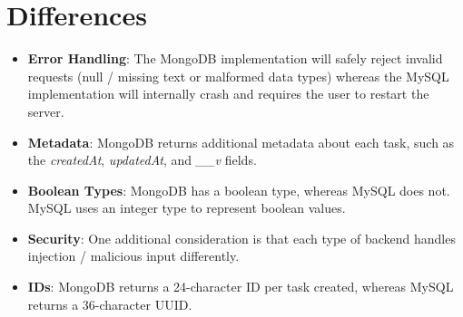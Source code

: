 \documentclass{article}
\begin{document}
\section{Differences}
\begin{itemize}
    \item \textbf{Error Handling}: The MongoDB implementation will safely reject invalid requests (null / missing text or malformed data types) whereas the MySQL implementation will internally crash and requires the user to restart the server.
    \item \textbf{Metadata}: MongoDB returns additional metadata about each task, such as the \textit{createdAt}, \textit{updatedAt}, and \textit{\_\_v} fields.
    \item \textbf{Boolean Types}: MongoDB has a boolean type, whereas MySQL does not. MySQL uses an integer type to represent boolean values.
    \item \textbf{Security}: One additional consideration is that each type of backend handles injection / malicious input differently.
    \item \textbf{IDs}: MongoDB returns a 24-character ID per task created, whereas MySQL returns a 36-character UUID.
\end{itemize}
\end{document}
